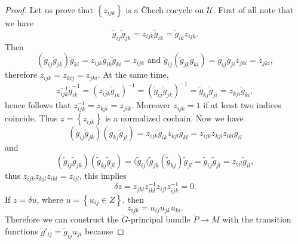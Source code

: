 \documentclass[12pt,letterpaper]{amsart}
\theoremstyle{definition}
\theoremstyle{plain}
\theoremstyle{remark}
\begin{document}
\begin{proof}
Let us prove that $\left\{ z_{ijk} \right\}$ is a \v Chech cocycle on $\mathcal{U}$.
First of all note that we have
\begin{equation}
\widetilde{g}_{ij} \widetilde{g}_{jk} = z_{ijk} \widetilde{g}_{ik} = \widetilde{g}_{ik} z_{ijk}.
\label{eq:51}
\end{equation}
Then
\begin{equation}
(\widetilde{g}_{ij} \widetilde{g}_{jk}) \widetilde{g}_{ki} = z_{ijk} \widetilde{g}_{ik} \widetilde{g}_{ki} = z_{ijk} \text{ and } \widetilde{g}_{ij} (\widetilde{g}_{jk} \widetilde{g}_{ki}) = \widetilde{g}_{ij} \widetilde{g}_{ji} z_{jki} = z_{jki},
\label{eq:52}
\end{equation}
therefore $z_{ijk} = z_{kij} = z_{jki}$.
At the same time,
\begin{equation}
z_{ijk}^{-1} \widetilde{g}_{ik}^{-1} = \left( z_{ijk} \widetilde{g}_{ik} \right)^{-1} = \left( \widetilde{g}_{ij} \widetilde{g}_{jk} \right)^{-1} = \widetilde{g}_{kj} \widetilde{g}_{ji} = z_{kji} \widetilde{g}_{ki},
\label{eq:53}
\end{equation}
hence follows that $z_{ijk}^{-1} = z_{kji} = z_{jik}$.
Moreover $z_{ijk} = 1$ if at least two indices coincide.
Thus $z = \left\{ z_{ijk} \right\}$ is a normalized cochain.
Now we have
\begin{equation}
(\widetilde{g}_{ij} \widetilde{g}_{jk}) (\widetilde{g}_{kj} \widetilde{g}_{jl}) = z_{ijk} \widetilde{g}_{ik} z_{kjl} \widetilde{g}_{kl} = z_{ijk} z_{kjl} z_{ikl} g_{il}
\label{eq:54}
\end{equation}
and
\begin{equation}
(\widetilde{g}_{ij} \widetilde{g}_{jk}) (\widetilde{g}_{kj} \widetilde{g}_{jl}) = (\widetilde{g}_{ij} (\widetilde{g}_{jk} (\widetilde{g}_{kj}) \widetilde{g}_{jl} = \widetilde{g}_{ij} \widetilde{g}_{jl} = z_{ijl} \widetilde{g}_{il},
\label{eq:55}
\end{equation}
thus $z_{ijk} z_{kjl} z_{ikl} = z_{ijl}$, this implies
\begin{equation}
\delta z = z_{jkl} z_{ikl}^{-1} z_{ijl} z_{ijk}^{-1} = 0.
\label{eq:56}
\end{equation}
If $z = \delta u$, where $u = \left\{ u_{ij} \in Z \right\}$, then
\begin{equation}
z_{ijk} = u_{ij} u_{jk} u_{ki}.
\label{eq:57}
\end{equation}
Therefore we can construct the $\widetilde{G}$-principal bundle $\widetilde{P} \to M$ with the transition functions $\widetilde{g}'_{ij} = \widetilde{g}_{ij} u_{ji}$ because

\end{proof}
\end{document}
